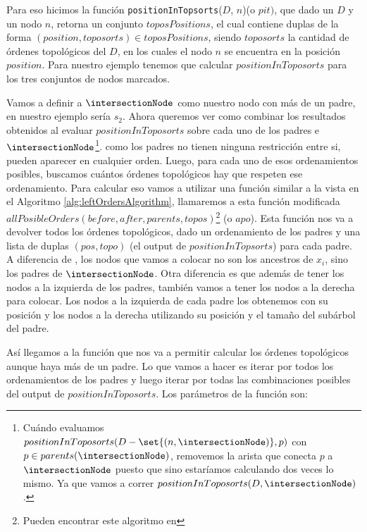 Para eso hicimos la función \texttt{positionInTopsorts}($D$, $n$)(o $pit)$, que dado un \dtree{} $D$ y un nodo $n$, retorna un conjunto $toposPositions$, el cual contiene duplas de la forma $(position, toposorts) \in toposPositions$, siendo $toposorts$ la cantidad de órdenes topológicos del \dtree{} $D$, en los cuales el nodo $n$ se encuentra en la posición $position$. Para nuestro ejemplo tenemos que calcular $positionInToposorts$ para los tres conjuntos de nodos marcados.

Vamos a definir a $\intersectionNode$ como nuestro nodo con más de un padre, en nuestro ejemplo sería $s_2$. Ahora queremos ver como combinar los resultados obtenidos al evaluar $positionInToposorts$ sobre cada uno de los padres e $\intersectionNode$\footnote{Cuándo evaluamos $positionInToposorts(D-\set{(n,\intersectionNode)},p)$ con $p \in parents(\intersectionNode)$, removemos la arista que conecta $p$ a $\intersectionNode$ puesto que sino estaríamos calculando dos veces lo mismo. Ya que vamos a correr $positionInToposorts(D,\intersectionNode)$.}. como los padres no tienen ninguna restricción entre si, pueden aparecer en cualquier orden. Luego, para cada uno de esos ordenamientos posibles, buscamos cuántos órdenes topológicos hay que respeten ese ordenamiento. Para calcular eso vamos a utilizar una función similar a la vista en el Algoritmo \ref{alg:leftOrdersAlgorithm}, llamaremos a esta función modificada $allPosibleOrders(before,after,parents, topos)$\footnote{Pueden encontrar este algoritmo en } (o $apo$). Esta función nos va a devolver todos los órdenes topológicos, dado un ordenamiento de los padres y una lista de duplas $(pos,topo)$ (el output de $positionInTopsorts$) para cada padre. A diferencia de \leftPossibleOrders, los nodos que vamos a colocar no son los ancestros de $x_i$, sino los padres de $\intersectionNode$. Otra diferencia es que además de tener los nodos a la izquierda de los padres, también vamos a tener los nodos a la derecha para colocar. Los nodos a la izquierda de cada padre los obtenemos con su posición y los nodos a la derecha utilizando su posición y el tamaño del subárbol del padre.


Así llegamos a la función que nos va a permitir calcular los órdenes topológicos aunque haya más de un padre. Lo que vamos a hacer es iterar por todos los ordenamientos de los padres y luego iterar por todas las combinaciones posibles del output de $positionInToposorts$. Los parámetros de la función son:


